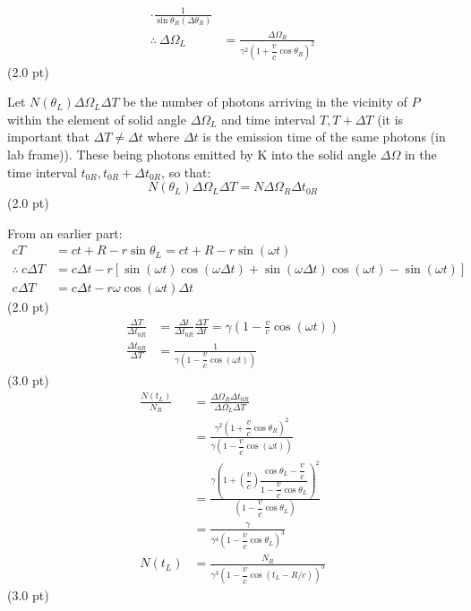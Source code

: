 \begin{description}
\begin{align*}
         \cdot\frac{1}{\sin\theta_R(\Delta\theta_R)}\\
    \therefore\ \Delta\Omega_L
      &= \frac{\Delta\Omega_R}
              {\gamma^2\left(1 + \dfrac{v}{c}\cos\theta_R\right)^2}
  \end{align*}
  \hfill(2.0 pt)
\item[(e)] Let $N(\theta_L)\Delta\Omega_L\Delta T$ be the number of photons
  arriving in the vicinity of $P$ within the element of solid angle
  $\Delta\Omega_L$ and time interval $T, T + \Delta T$ (it is important that
  $\Delta T \neq \Delta t$ where $\Delta t$ is the emission time of the same
  photons (in lab frame)). These being photons emitted by K into the solid
  angle $\Delta\Omega$ in the time interval $t_{0R}, t_{0R} + \Delta t_{0R}$,
  so that:
  \[ N(\theta_L)\Delta\Omega_L\Delta T = N\Delta\Omega_R\Delta t_{0R} \]
  \hfill(2.0 pt)

  From an earlier part:
  \begin{align*}
    cT &= ct + R - r\sin\theta_L = ct + R - r\sin(\omega t)\\
    \therefore\ c\Delta T &= c\Delta t
      - r\left[\sin(\omega t)\cos(\omega\Delta t)
      + \sin(\omega\Delta t)\cos(\omega t) - \sin(\omega t)\right]\\
    c\Delta T &= c\Delta t - r\omega\cos(\omega t)\Delta t
  \end{align*}
  \hfill(2.0 pt)
  \begin{align*}
    \frac{\Delta T}{\Delta t_{0R}}
      &= \frac{\Delta t}{\Delta t_{0R}}\frac{\Delta T}{\Delta t}
       = \gamma\left(1 - \frac{v}{c}\cos(\omega t)\right)\\
    \frac{\Delta t_{0R}}{\Delta T}
      &= \frac{1}{\gamma\left(1 - \dfrac{v}{c}\cos(\omega t)\right)}
  \end{align*}
  \hfill(3.0 pt)
  \begin{align*}
    \frac{N(t_L)}{N_R}
      &= \frac{\Delta\Omega_R\Delta t_{0R}}{\Delta\Omega_L\Delta T}\\
      &= \frac{\gamma^2\left(1 + \dfrac{v}{c}\cos\theta_R\right)^2}
              {\gamma\left(1 - \dfrac{v}{c}\cos(\omega t)\right)}\\
      &= \frac{\gamma\left(1 + \left(\dfrac{v}{c}\right)
          \dfrac{\cos\theta_L - \dfrac{v}{c}}
                {1 - \dfrac{v}{c}\cos\theta_L}\right)^2}
              {\left(1 - \dfrac{v}{c}\cos\theta_L\right)}\\
      &= \frac{\gamma}
              {\gamma^4\left(1 - \dfrac{v}{c}\cos\theta_L\right)^3}\\
    N(t_L) &= \frac{N_R}
      {\gamma^3\left(1 - \dfrac{v}{c}\cos\left(t_L - R/c\right)\right)^3}
  \end{align*}
  \hfill(3.0 pt)


\end{description}
